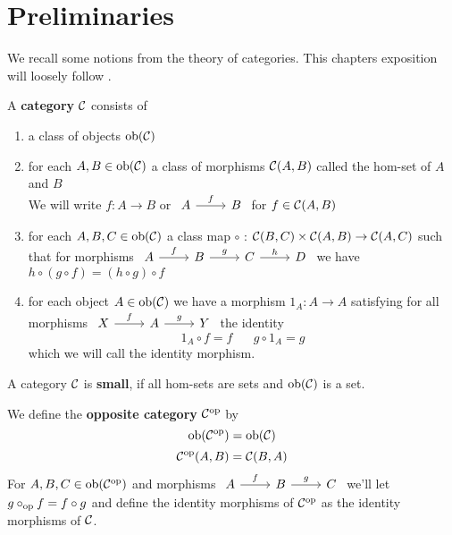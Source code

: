 \chapter{Preliminaries}
    We recall some notions from the theory of categories. This chapters exposition will loosely follow \cite{Leinster14}.
\begin{definition}
    A \textbf{category} $\mathcal{C}$ consists of
    \begin{enumerate}
        \item a class of objects $\text{ob}(\mathcal{C})$
        \item for each $A,B\in\text{ob}(\mathcal{C})$ a class of morphisms $\mathcal{C}(A,B)$ called the hom-set of $A$ and $B$\\
        We will write $f : A\to B$ or
$\begin{tikzcd}
A & B
\arrow["f", from=1-1, to=1-2]
\end{tikzcd}$ for $f\in\mathcal{C}(A,B)$
        \item for each $A,B,C\in\text{ob}(\mathcal{C})$ a class map $\circ$ : $\mathcal{C}(B,C)\times\mathcal{C}(A,B)\to \mathcal{C}(A,C)$ such that
    for morphisms $\begin{tikzcd}
        A & B & C & D
        \arrow["f", from=1-1, to=1-2]
        \arrow["g", from=1-2, to=1-3]
        \arrow["h", from=1-3, to=1-4]
    \end{tikzcd}$ we have $h\circ(g\circ f) = (h\circ g)\circ f$
        \item for each object $A\in\text{ob}(\mathcal{C})$ we have a morphism $1_A : A\to A$ satisfying
         for all morphisms $\begin{tikzcd}
            X & A & Y
            \arrow["f", from=1-1, to=1-2]
            \arrow["g", from=1-2, to=1-3]
        \end{tikzcd}$ the identity
        \[1_A \circ f = f \hspace{20pt} g \circ 1_A = g \]
        which we will call the identity morphism. 
    \end{enumerate}
    A category $\mathcal{C}$ is \textbf{small}, if all hom-sets are sets and $\text{ob}(\mathcal{C})$ is a set. \par
    We define the \textbf{opposite category} $\mathcal{C}^{\text{op}}$ by
    \[\text{ob}(\mathcal{C}^{\text{op}}) = \text{ob}(\mathcal{C})\]
    \[\mathcal{C}^{\text{op}}(A,B) = \mathcal{C}(B,A)\]
    For $A,B,C\in\text{ob}(\mathcal{C}^{\text{op}})$ and morphisms $\begin{tikzcd}
	A & B & C
	\arrow["f", from=1-1, to=1-2]
	\arrow["g", from=1-2, to=1-3]
\end{tikzcd}$ we'll let $g\circ_{\text{op}} f = f\circ g$ and define the identity morphisms of $\mathcal{C}^{\text{op}}$ as the identity morphisms of $\mathcal{C}$.
\end{definition}
